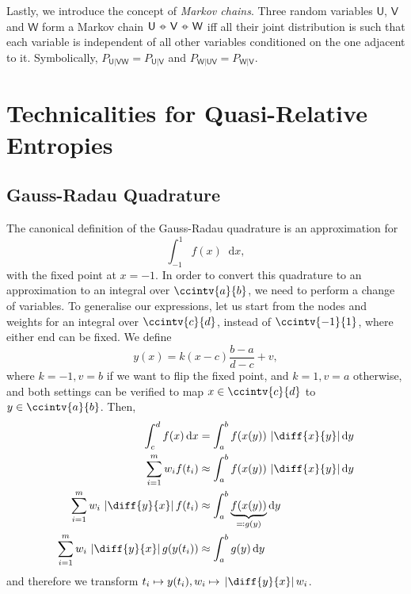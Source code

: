 \documentclass[10pt, a4paper]{article}
\numberwithin{equation}{section} %
\theoremstyle{definition}
\theoremstyle{plain}
\newcommand{\abs}[1]{\mathop{}\left\lvert#1\right\rvert}
\newcommand{\dif}{\mathop{}\!\mathrm{d}} %
\newcommand{\?}{\mathrel{?}} %
\newcommand*\markov{\mathrel{\ooalign{\hidewidth$\circ$\hidewidth\cr$-$\cr}}} %
\newcommand{\crv}[1]{\mathsf{#1}}
\begin{document}
\begin{appendices}
      Lastly, we introduce the concept of \emph{Markov chains}. Three random variables \(\crv{U}\), \(\crv{V}\) and \(\crv{W}\) form a Markov chain \(\crv{U} \markov \crv{V} \markov \crv{W}\) iff all their joint distribution is such that each variable is independent of all other variables conditioned on the one adjacent to it. Symbolically, \(P_{\crv{U}|\crv{VW}} = P_{\crv{U}|\crv{V}}\) and \(P_{\crv{W}|\crv{UV}} = P_{\crv{W}|\crv{V}}\).

                    \section{Technicalities for Quasi-Relative Entropies}\label{sec:qretech}

                    \subsection{Gauss-Radau Quadrature}\label{sec:qretech_grq}

                    The canonical definition of the Gauss-Radau quadrature is an approximation for
                    \[ \int_{-1}^{1} f(x) \dif{x}, \]
                    with the fixed point at \(x = -1\). In order to convert this quadrature to an approximation to an integral over \(\ccintv{a}{b}\), we need to perform a change of variables. To generalise our expressions, let us start from the nodes and weights for an integral over \(\ccintv{c}{d}\), instead of \(\ccintv{-1}{1}\), where either end can be fixed. We define
                    \[ y(x) = k(x - c)\frac{b - a}{d - c} + v, \]
                    where \(k = -1, v = b\) if we want to flip the fixed point, and \(k = 1, v = a\) otherwise, and both settings can be verified to map \(x\in\ccintv{c}{d}\) to \(y\in\ccintv{a}{b}\). Then,
                    \begin{align*}
                      \int_{c}^{d} f(x) \dif{x} &= \int_{a}^{b} f(x(y)) \abs{\diff{x}{y}} \dif{y} \\
                      \sum_{i=1}^m w_i f(t_i) &\approx \int_{a}^{b} f(x(y)) \abs{\diff{x}{y}} \dif{y} \\
                      \sum_{i=1}^m w_i \abs{\diff{y}{x}} f(t_i) &\approx \int_{a}^{b} \underbrace{f(x(y))}_{\eqqcolon g(y)} \dif{y} \\
                      \sum_{i=1}^m w_i \abs{\diff{y}{x}} g(y(t_i)) &\approx \int_{a}^{b} g(y) \dif{y}
                    \end{align*}
                    and therefore we transform \(t_i \mapsto y(t_i), w_i \mapsto \abs{\diff{y}{x}} w_i\).


\end{appendices}
\end{document}
